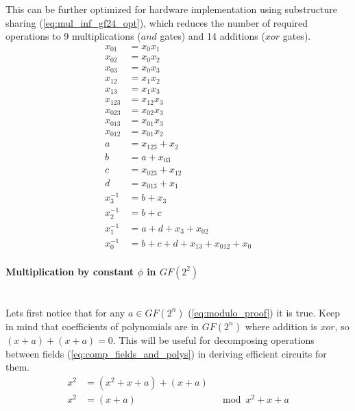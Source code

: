 This can be further optimized for hardware implementation using substructure sharing (\ref{eq:mul_inf_gf24_opt}), which reduces the number of required operations to 9 multiplications ($and$ gates) and 14 additions ($xor$ gates).
\begin{equation}
\label{eq:mul_inf_gf24_opt}
\begin{aligned}
x_{01}   &= x_0x_1                             \\
x_{02}   &= x_0x_2                             \\
x_{03}   &= x_0x_3                             \\
x_{12}   &= x_1x_2                             \\
x_{13}   &= x_1x_3                             \\
x_{123}  &= x_{12}x_3                          \\
x_{023}  &= x_{02}x_3                          \\
x_{013}  &= x_{01}x_3                          \\
x_{012}  &= x_{01}x_2                          \\
a        &= x_{123} + x_2                      \\
b        &= a + x_{03}                         \\
c        &= x_{023} + x_{12}                   \\
d        &= x_{013} + x_{1}                    \\
x_3^{-1} &= b + x_3                            \\
x_2^{-1} &= b + c                              \\
x_1^{-1} &= a + d + x_3 + x_{02}               \\
x_0^{-1} &= b + c + d + x_{13} + x_{012} + x_0
\end{aligned}
\end{equation}


\paragraph{Multiplication by constant $\phi$ in $GF(2^2)$}\mbox{}\\
Lets first notice that for any $a \in GF(2^n)$ (\ref{eq:modulo_proof}) it is true. Keep in mind that coefficients of polynomials are in $GF(2^n)$ where addition is $xor$, so $(x + a) + (x + a) = 0$. This will be useful for decomposing operations between fields (\ref{eq:comp_fields_and_polys}) in deriving efficient circuits for them.
\begin{equation}
\label{eq:modulo_proof}
\begin{aligned}
x^2 &= (x^2 + x + a) + (x + a) &\\
x^2 &= (x + a)                 &\mod  x^2 + x + a
\end{aligned}
\end{equation}

